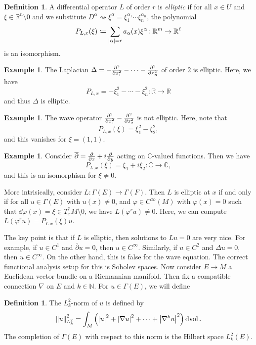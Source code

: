 \documentclass[leqno, openany]{memoir}
\theoremstyle{definition}
\newtheorem{defn}[thm]{Definition}
\newtheorem{exm}[thm]{Example}
\theoremstyle{remark}
\theoremstyle{plain}
\theoremstyle{definition}
\theoremstyle{remark}
\newcommand{\N}{\mathbb{N}}
\newcommand{\R}{\mathbb{R}}
\newcommand{\C}{\mathbb{C}}
\newcommand{\mr}[1]{\mathrm{#1}}
\newcommand{\ol}[1]{\overline{#1}}
\begin{document}
\begin{defn} A differential operator $L$ of order $r$ is \textit{elliptic} if
    for all $x \in U$ and $\xi \in \R^n \setminus \qty{0}$ and we substitute
    $D^{\alpha} \rightsquigarrow \xi^{\alpha} = \xi_1^{\alpha_1} \cdots
    \xi_n^{\alpha_n}$, the polynomial \[ P_{L, x}(\xi) \coloneqq
    \sum_{\abs{\alpha} = r} a_{\alpha}(x) \xi^{\alpha} \colon \R^m \to
\R^{\ell} \] is an isomorphism.  \end{defn}

\begin{exm} The Laplacian $\Delta = -\pdv[2]{x_1} - \cdots - \pdv[2]{x_n}$ of
    order $2$ is elliptic. Here, we have \[ P_{L,x} = - \xi_1^2 - \cdots -
    \xi_n^2 \colon \R \to \R \] and thus $\Delta$ is elliptic.  \end{exm}

\begin{exm} The wave operator $\pdv[2]{x_1} - \pdv[2]{x_2}$ is not elliptic.
    Here, note that \[ P_{L, x}(\xi) = \xi_1^2 - \xi_2^2, \] and this vanishes
for $\xi = (1,1)$.  \end{exm}

\begin{exm} Consider $\ol{\partial} = \pdv{x} + i \pdv{y}$ acting on
    $\C$-valued functions. Then we have \[ P_{L, x}(\xi) = \xi_1 + i \xi_2
    \colon \C \to \C, \] and this is an isomorphism for $\xi \neq 0$.
\end{exm}

More intrisically, consider $L \colon \Gamma(E) \to \Gamma(F)$. Then $L$ is
elliptic at $x$ if and only if for all $u \in \Gamma(E)$ with $u(x) \neq 0$,
and $\varphi \in C^{\infty}(M)$ with $\varphi(x) = 0$ such that
$\dd{\varphi(x)} = \xi \in T_x^*M \setminus \qty{0}$, we have $L(\varphi^r u)
\neq 0$. Here, we can compute $L(\varphi^r u) = P_{L.x}(\xi) u$.

The key point is that if $L$ is elliptic, then solutions to $Lu = 0$ are very
nice. For example, if $u \in C^1$ and $\ol{\partial} u = 0$, then $u \in
C^{\infty}$. Similarly, if $u \in C^2$ and $\Delta u = 0$, then $u \in
C^{\infty}$. On the other hand, this is false for the wave equation. The
correct functional analysis setup for this is Sobolev spaces. Now consider $E
\to M$ a Euclidean vector bundle on a Riemannian manifold. Then fix a
compatible connection $\nabla$ on $E$ and $k \in \N$. For $u \in \Gamma(E)$, we
will define

\begin{defn} The $L^2_k$-norm of $u$ is defined by \[ \norm{u}_{L^2_k}^2 =
\int_M \qty(\abs{u}^2 + \abs{\nabla u}^2 + \cdots + \abs{\nabla^k u}^2)
\dd{\mr{vol}}. \] The completion of $\Gamma(E)$ with respect to this norm is
the Hilbert space $L^2_k(E)$.  \end{defn}
\end{document}
